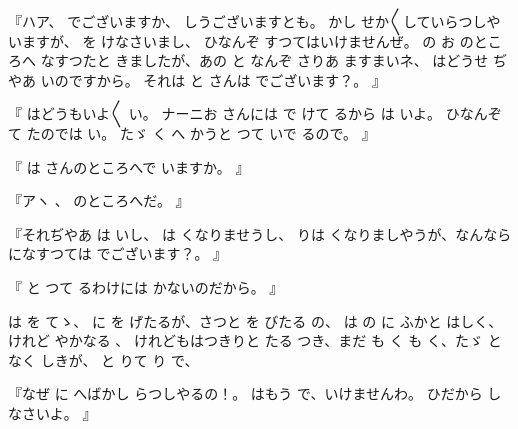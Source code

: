 『ハア、
でございますか、
しうございますとも。
かし
せか〳〵していらつしやいますが、
を
けなさいまし、
ひなんぞ
すつてはいけませんぜ。
の
お
のところへ
なすつたと
きましたが、あの
と
なんぞ
さりあ
ますまいネ、
はどうせ
ぢやあ
いのですから。
それは
と
さんは
でございます？。
』

『
はどうもいよ〳〵
い。
ナーニお
さんには
で
けて
るから
は
いよ。
ひなんぞ
て
たのでは
い。
たゞ
く
へ
かうと
つて
いで
るので。
』

『
は
さんのところへで
いますか。
』

『アヽ
、
のところへだ。
』

『それぢやあ
は
いし、
は
くなりませうし、
りは
くなりましやうが、なんなら
になすつては
でございます？。
』

『
と
つて
るわけには
かないのだから。
』

は
を
てゝ、
に
を
げたるが、さつと
を
びたる
の、
は
の
に
ふかと
はしく、
けれど
やかなる
、
けれどもはつきりと
たる
つき、まだ
も
く
も
く、たゞ
と
なく
しきが、
と
りて
り
で、

『なぜ
に
へばかし
らつしやるの！。
はもう
で、いけませんわ。
ひだから
しなさいよ。
』


